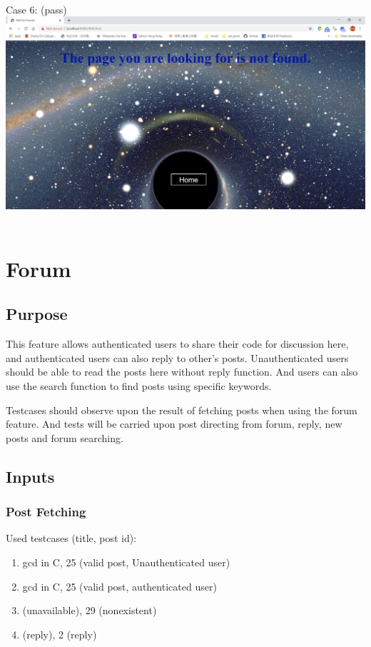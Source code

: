 ~

Case 6: (pass)\\
\includegraphics[scale=0.45]{Doc/Pics/404}\\

~

\section{Forum}
\subsection{Purpose}
This feature allows authenticated users to share their code for discussion here, and authenticated users can also reply to other's posts. Unauthenticated users should be able to read the posts here without reply function. And users can also use the search function to find posts using specific keywords.

Testcases should observe upon the result of fetching posts when using the forum feature. And tests will be carried upon post directing from forum, reply, new posts and forum searching.

\subsection{Inputs}
\subsubsection{Post Fetching}
Used testcases (title, post id):
\begin{enumerate}
  \item gcd in C, 25 (valid post, Unauthenticated user)
  \item gcd in C, 25 (valid post, authenticated user)
  \item (unavailable), 29 (nonexistent)
  \item (reply), 2 (reply)
\end{enumerate}

